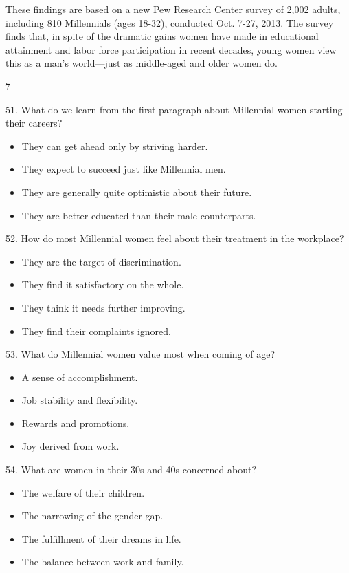 \documentclass[UTF8,11pt]{ctexart}
\begin{document}
These findings are based on a new Pew Research Center survey of 2,002 adults, including 810 Millennials (ages 18-32), conducted Oct. 7-27, 2013. The survey finds that, in spite of the dramatic gains women have made in educational attainment and labor force participation in recent decades, young women view this as a man's world—just as middle-aged and older women do.


7


51. What do we learn from the first paragraph about Millennial women starting their careers?


\begin{itemize}[leftmargin=2em,itemsep=.2em,topsep=.4em]\item[A.] They can get ahead only by striving harder.
\item[B.] They expect to succeed just like Millennial men.
\item[C.] They are generally quite optimistic about their future.
\item[D.] They are better educated than their male counterparts.
\end{itemize}

52. How do most Millennial women feel about their treatment in the workplace?


\begin{itemize}[leftmargin=2em,itemsep=.2em,topsep=.4em]\item[A.] They are the target of discrimination.
\item[B.] They find it satisfactory on the whole.
\item[C.] They think it needs further improving.
\item[D.] They find their complaints ignored.
\end{itemize}

53. What do Millennial women value most when coming of age?


\begin{itemize}[leftmargin=2em,itemsep=.2em,topsep=.4em]\item[A.] A sense of accomplishment.
\item[B.] Job stability and flexibility.
\item[C.] Rewards and promotions.
\item[D.] Joy derived from work.
\end{itemize}

54. What are women in their 30s and 40s concerned about?


\begin{itemize}[leftmargin=2em,itemsep=.2em,topsep=.4em]\item[A.] The welfare of their children.
\item[B.] The narrowing of the gender gap.
\item[C.] The fulfillment of their dreams in life.
\item[D.] The balance between work and family.
\end{itemize}
\end{document}
